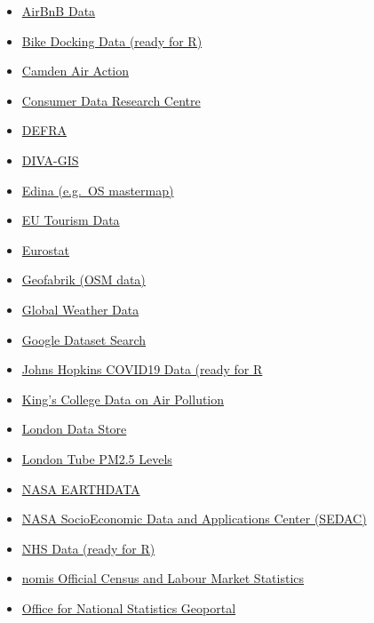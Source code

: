 \documentclass[
]{book}
\providecommand{\tightlist}{%
  \setlength{\itemsep}{0pt}\setlength{\parskip}{0pt}}
\begin{document}
\begin{itemize}
\tightlist
\item
  \href{http://insideairbnb.com/get-the-data.html}{AirBnB Data}
\item
  \href{https://docs.ropensci.org/bikedata/}{Bike Docking Data (ready for R)}
\item
  \href{https://camdenairaction.wordpress.com/2017/02/20/schools-monitoring-project-spring-2017/}{Camden Air Action}
\item
  \href{https://data.cdrc.ac.uk/}{Consumer Data Research Centre}
\item
  \href{https://environment.data.gov.uk/}{DEFRA}
\item
  \href{https://www.diva-gis.org/}{DIVA-GIS}
\item
  \href{https://digimap.edina.ac.uk/}{Edina (e.g.~OS mastermap)}
\item
  \href{https://ec.europa.eu/eurostat/statistics-explained/index.php/Tourism_statistics}{EU Tourism Data}
\item
  \href{https://ec.europa.eu/eurostat}{Eurostat}
\item
  \href{https://www.geofabrik.de/}{Geofabrik (OSM data)}
\item
  \href{https://rp5.ru/Weather_in_the_world}{Global Weather Data}
\item
  \href{https://datasetsearch.research.google.com/}{Google Dataset Search}
\item
  \href{https://github.com/RamiKrispin/coronavirus}{Johns Hopkins COVID19 Data (ready for R}
\item
  \href{https://www.londonair.org.uk/LondonAir/Default.aspx}{King's College Data on Air Pollution}
\item
  \href{https://data.london.gov.uk/}{London Data Store}
\item
  \href{https://www.ft.com/content/6f381ad4-fef7-11e9-be59-e49b2a136b8d}{London Tube PM2.5 Levels}
\item
  \href{https://earthdata.nasa.gov/}{NASA EARTHDATA}
\item
  \href{https://sedac.ciesin.columbia.edu/}{NASA SocioEconomic Data and Applications Center (SEDAC)}
\item
  \href{https://nhs-r-community.github.io/NHSRdatasets/}{NHS Data (ready for R)}
\item
  \href{https://www.nomisweb.co.uk/}{nomis Official Census and Labour Market Statistics}
\item
  \href{https://geoportal.statistics.gov.uk/}{Office for National Statistics Geoportal}

\end{itemize}
\end{document}
